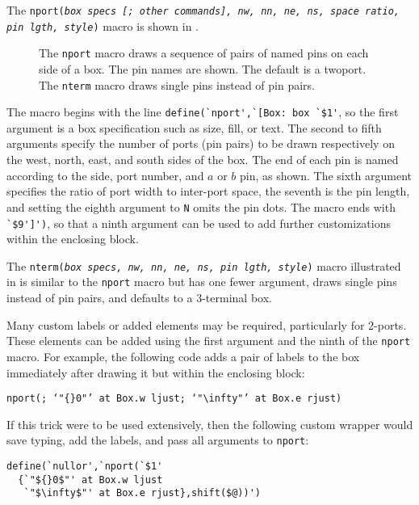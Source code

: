 The {\tt nport({\sl box specs {\tt[;} other commands{\tt]},
  nw, nn, ne, ns, space ratio, pin lgth, style})}
macro is shown in .
\begin{figure}[h!t]
   
   \caption{The {\tt nport} macro draws a sequence of pairs of named pins
     on each side of a box.  The pin names are shown.  The default is a twoport.
     The {\tt nterm} macro draws single pins instead of pin pairs.}
   \label{Nport}
   \end{figure}
The macro begins with the line
 \verb|define(`nport',`[Box: box `$1'|,
so the first argument is a box specification such as size, fill,
or text.
The second to fifth arguments specify the number of ports
(pin pairs) to be drawn respectively on the west, north, east, and south
sides of the box.  The end of each pin is named according to the
side, port number, and $a$ or $b$ pin, as shown.
The sixth argument
specifies the ratio of port width to inter-port space, the seventh is
the pin length, and setting the eighth argument to {\tt N} omits the pin
dots.
The macro ends with \verb|`$9']')|, so that a ninth argument can be used
to add further customizations within the enclosing block.

The {\tt nterm({\sl box specs, nw, nn, ne, ns, pin lgth, style})} macro
illustrated in  is similar to the {\tt nport} macro but
has one fewer argument, draws single pins instead of pin pairs, and
defaults to a 3-terminal box.

Many custom labels or added elements may be required, particularly for
2-ports\label{Nports:}. These elements can be added using the first
argument and the ninth of the {\tt nport} macro.
For example, the following code adds a pair of labels to the box
immediately after drawing it but within the enclosing block:

{\tt nport(; {`"${}0$"'\ at Box.w ljust; `"$\infty$"'\ at
 Box.e rjust})}

If this trick were to be used extensively, then the following custom wrapper
would save typing, add the labels, and pass all arguments to
{\tt nport}:
\pagebreak

\begin{verbatim}
define(`nullor',`nport(`$1'
  {`"${}0$"' at Box.w ljust
   `"$\infty$"' at Box.e rjust},shift($@))')
\end{verbatim}

